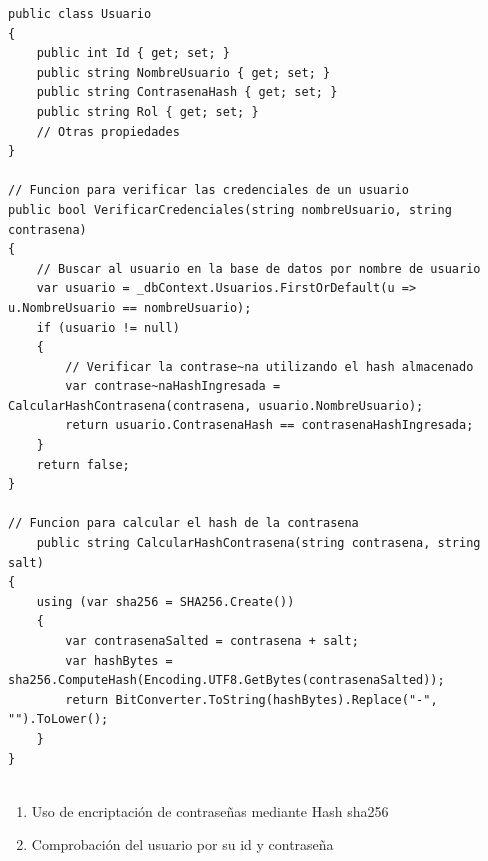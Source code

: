 \documentclass{article} %
\begin{document}
\begin{lstlisting}
public class Usuario
{
    public int Id { get; set; }
    public string NombreUsuario { get; set; }
    public string ContrasenaHash { get; set; }
    public string Rol { get; set; }
    // Otras propiedades
}

// Funcion para verificar las credenciales de un usuario
public bool VerificarCredenciales(string nombreUsuario, string contrasena)
{
    // Buscar al usuario en la base de datos por nombre de usuario
    var usuario = _dbContext.Usuarios.FirstOrDefault(u => u.NombreUsuario == nombreUsuario);
    if (usuario != null)
    {
        // Verificar la contrase~na utilizando el hash almacenado
        var contrase~naHashIngresada = CalcularHashContrasena(contrasena, usuario.NombreUsuario);
        return usuario.ContrasenaHash == contrasenaHashIngresada;
    }
    return false;
}

// Funcion para calcular el hash de la contrasena
    public string CalcularHashContrasena(string contrasena, string salt)
{
    using (var sha256 = SHA256.Create())
    {
        var contrasenaSalted = contrasena + salt;
        var hashBytes = sha256.ComputeHash(Encoding.UTF8.GetBytes(contrasenaSalted));
        return BitConverter.ToString(hashBytes).Replace("-", "").ToLower();
    }
}


\end{lstlisting}
\begin{enumerate}
    \item Uso de encriptación de contraseñas mediante Hash sha256
    \item Comprobación del usuario por su id y contraseña
    
\end{enumerate}
\end{document}
